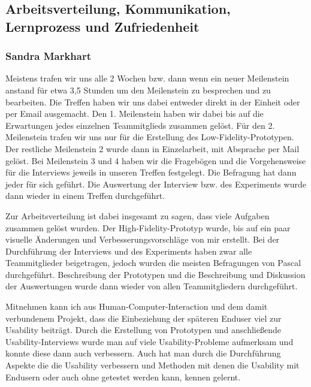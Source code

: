 \documentclass[a4paper,10pt]{scrartcl}
\begin{document}
\subsection{Arbeitsverteilung, Kommunikation, Lernprozess und Zufriedenheit}



\subsubsection{Sandra Markhart}

Meistens trafen wir uns alle 2 Wochen bzw. dann wenn ein neuer Meilenstein anstand für etwa 3,5 Stunden um den Meilenstein zu besprechen und zu bearbeiten. Die Treffen haben wir uns
dabei entweder direkt in der Einheit oder per Email ausgemacht. Den 1. Meilenstein haben wir dabei bis auf die Erwartungen jedes einzelnen Teammitglieds zusammen gelöst.
Für den 2. Meilenstein trafen wir uns nur für die Erstellung des Low-Fidelity-Prototypen. Der restliche Meilenstein 2 wurde dann in Einzelarbeit, mit Absprache per Mail
gelöst. Bei Meilenstein 3 und 4 haben wir die Fragebögen und die Vorgehensweise für die Interviews
jeweils in unseren Treffen festgelegt. Die Befragung hat dann jeder für sich geführt. Die Auswertung der Interview bzw. des Experiments wurde dann wieder in einem Treffen durchgeführt.

\medskip

Zur Arbeitsverteilung ist dabei insgesamt zu sagen, dass viele Aufgaben zusammen gelöst wurden. Der High-Fidelity-Prototyp wurde, bis auf ein paar visuelle Änderungen
und Verbesserungsvorschläge von mir erstellt.
Bei der Durchführung der Interviews und des Experiments haben zwar alle Teammitglieder beigetragen, jedoch wurden die meisten Befragungen von Pascal durchgeführt. Beschreibung
der Prototypen und die Beschreibung und Diskussion der Auswertungen wurde dann wieder von allen Teammitgliedern durchgeführt.

\medskip

Mitnehmen kann ich aus Human-Computer-Interaction und dem damit verbundenem Projekt, dass die Einbeziehung der späteren Enduser viel zur Usability beiträgt. Durch die Erstellung von Prototypen und anschließende Usability-Interviews wurde man auf viele Usability-Probleme aufmerksam und
konnte diese dann auch verbessern. Auch hat man durch die Durchführung Aspekte die die Usability verbessern und Methoden mit denen die Usability mit Endusern oder auch ohne
getestet werden kann, kennen gelernt.
\end{document}
